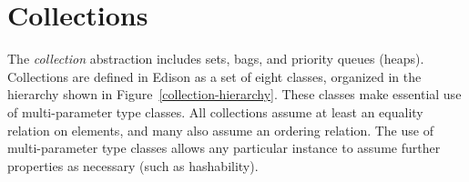 \documentclass{report}
\newcommand{\Figure}[1]{Figure~\ref{#1}}
\begin{document}

\chapter{Collections} \label{sec:coll}

The \emph{collection} abstraction includes sets, bags, and priority
queues (heaps).  Collections are defined in Edison as a set of eight
classes, organized in the hierarchy shown in \Figure{collection-hierarchy}.
These classes make essential use of multi-parameter type classes.
All collections assume at least an equality relation on elements, and
many also assume an ordering relation.  The use of multi-parameter type
classes allows any particular instance to assume further properties
as necessary (such as hashability).
\end{document}
